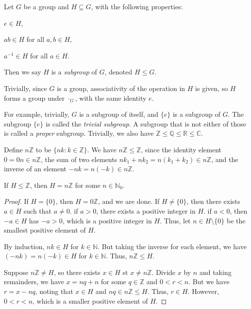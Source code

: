 \documentclass[12pt]{article}
\begin{document}
\begin{definition}
    Let $G$ be a group and $H \subseteq G$, with the following properties:
    \begin{compactitem}
    \item $e \in H$,
    \item $ab \in H$ for all $a,b \in H$,
    \item $a^{-1} \in H$ for all $a \in H$.
    \end{compactitem}
    Then we say $H$ is a \emph{subgroup} of $G$, denoted $H \le G$.
\end{definition}

Trivially, since $G$ is a group, associativity of
the operation in $H$ is given, so $H$ forms a group under $\cdot_G$, 
with the same identity $e$.

For example, trivially, $G$ is a subgroup of itself, and $\{e\}$ is a subgroup of $G$.
The subgroup $\{e\}$ is called the \emph{trivial subgroup}.
A subgroup that is not either of those is called a \emph{proper} subgroup.
Trivially, we also have $\mathbb{Z} \le \mathbb{Q} \le \mathbb{R} \le \mathbb{C}$.

Define $n\mathbb{Z}$ to be $\{nk : k \in \mathbb{Z}\}$. We have $n\mathbb{Z} \le \mathbb{Z}$,
since the identity element $0 = 0n \in n\mathbb{Z}$,
the sum of two elements $nk_{1} + nk_{2} = n(k_{1}+k_{2}) \in n\mathbb{Z}$,
and the inverse of an element $-nk = n(-k) \in n\mathbb{Z}$.

\begin{prop}
    If $H \le \mathbb{Z}$, then $H = n\mathbb{Z}$ for some $n \in \mathbb{N}_0$.
\end{prop}
\begin{proof}
    If $H = \{0\}$, then $H = 0\mathbb{Z}$, and we are done.
    If $H \ne \{0\}$, then there exists $a \in H$ such that $a \ne 0$.
    if $a > 0$, there exists a positive integer in $H$.
    if $a < 0$, then $-a \in H$ has $-a > 0$, which is a positive integer in $H$.
    Thus, let $n \in H \setminus \{0\}$ be the smallest positive element of $H$.

    By induction, $nk \in H$ for $k \in \mathbb{N}$.
    But taking the inverse for each element, we have $(-nk) = n(-k) \in H$ for $k \in \mathbb{N}$.
    Thus, $n\mathbb{Z} \le H$.

    Suppose $n\mathbb{Z} \ne H$, so there exists $x \in H$ st $x \ne n\mathbb{Z}$.
    Divide $x$ by $n$ and taking remainders, we have
    $x = nq + n$ for some $q \in \mathbb{Z}$ and $0 < r < n$.
    But we have $r = x - nq$, noting that
    $x \in H$ and $nq \in n\mathbb{Z} \le H$.
    Thus, $r \in H$. However, $0 < r < n$,
    which is a smaller positive element of $H$. \contra
\end{proof}
\end{document}
